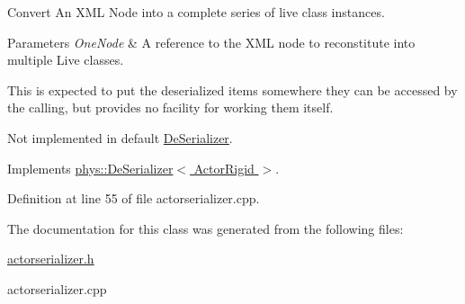 Convert An XML Node into a complete series of live class instances. 


\begin{DoxyParams}{Parameters}
{\em OneNode} & A reference to the XML node to reconstitute into multiple Live classes.\\
\hline
\end{DoxyParams}
This is expected to put the deserialized items somewhere they can be accessed by the calling, but provides no facility for working them itself. \par
 \par
 Not implemented in default \hyperlink{classphys_1_1DeSerializer}{DeSerializer}. 

Implements \hyperlink{classphys_1_1DeSerializer_a22bf7e17185f735f36ddd4a93c2e5168}{phys::DeSerializer$<$ ActorRigid $>$}.



Definition at line 55 of file actorserializer.cpp.



The documentation for this class was generated from the following files:\begin{DoxyCompactItemize}
\item 
\hyperlink{actorserializer_8h}{actorserializer.h}\item 
actorserializer.cpp\end{DoxyCompactItemize}
